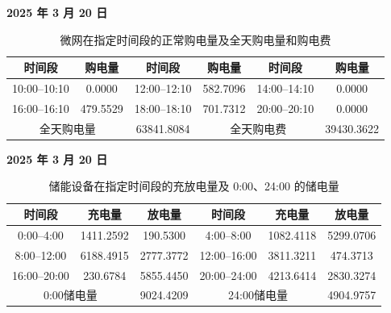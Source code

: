 \documentclass[12pt,a4paper]{ctexart}
\renewcommand{\textbf}[1]{{\CJKfamily{heiti}\bfseries #1}}
\begin{document}
\begin{table}[H]
\centering
\caption{微网在指定时间段的正常购电量及全天购电量和购电费}
\label{tab:q2-purchase-selected}
\small
\textbf{2025 年 3 月 20 日}\par
\begin{tabular}{|c|c|c|c|c|c|}
\hline
时间段 & 购电量 & 时间段 & 购电量 & 时间段 & 购电量\\
\hline
10:00--10:10 & 0.0000 & 12:00--12:10 & 582.7096 & 14:00--14:10 & 0.0000\\
\hline
16:00--16:10 & 479.5529 & 18:00--18:10 & 701.7312 & 20:00--20:10 & 0.0000\\
\hline
\multicolumn{2}{|c|}{全天购电量} & 63841.8084 & \multicolumn{2}{c|}{全天购电费} & 39430.3622\\
\hline
\end{tabular}
\end{table}

\begin{table}[H]
\centering
\caption{储能设备在指定时间段的充放电量及 0:00、24:00 的储电量}
\label{tab:q2-storage-selected}
\small
\textbf{2025 年 3 月 20 日}\par
\begin{tabular}{|c|c|c|c|c|c|}
\hline
时间段 & 充电量 & 放电量 & 时间段 & 充电量 & 放电量\\
\hline
0:00--4:00 & 1411.2592 & 190.5300 & 4:00--8:00 & 1082.4118 & 5299.0706\\
\hline
8:00--12:00 & 6188.4915 & 2777.3772 & 12:00--16:00 & 3811.3211 & 474.3713\\
\hline
16:00--20:00 & 230.6784 & 5855.4450 & 20:00--24:00 & 4213.6414 & 2830.3274\\
\hline
\multicolumn{2}{|c|}{0:00储电量} & 9024.4209 & \multicolumn{2}{c|}{24:00储电量} & 4904.9757\\
\hline
\end{tabular}
\end{table}

\begin{table}[H]
\centering
\caption{微网在指定日期的紧急购电量}
\label{tab:q2-emergency-selected}
\footnotesize
{}
\end{table}
\end{document}

